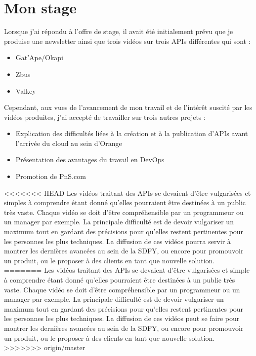 \chapter{Mon stage}
\label{sec:unchapitre}

Lorsque j'ai répondu à l'offre de stage, il avait été initialement prévu que je produise une newsletter ainsi que trois vidéos sur trois APIs différentes qui sont :

\begin{itemize}
    \item Gat'Ape/Okapi
    \item Zbus
    \item Valkey
\end{itemize}

Cependant, aux vues de l'avancement de mon travail et de l'intérêt suscité par les vidéos produites, j'ai accepté de travailler sur trois autres projets :

\begin{itemize}
    \item Explication des difficultés liées à la création et à la publication d'APIs avant l'arrivée du cloud au sein d'Orange
    \item Présentation des avantages du travail en DevOps
    \item Promotion de PnS.com
\end{itemize}



<<<<<<< HEAD
Les vidéos traitant des APIs se devaient d'être vulgarisées et simples à comprendre étant donné qu'elles pourraient être destinées à un public très vaste. Chaque vidéo se doit d'être compréhensible par un programmeur ou un manager par exemple. La principale difficulté est de devoir vulgariser un maximum tout en gardant des précisions pour qu'elles restent pertinentes pour les personnes les plus techniques. La diffusion de ces vidéos pourra servir à montrer les dernières avancées au sein de la SDFY, ou encore pour promouvoir un produit, ou le proposer à des clients en tant que nouvelle solution. \\
=======
Les vidéos traitant des APIs se devaient d'être vulgarisées et simple à comprendre étant donné qu'elles pourraient être destinées à un public très vaste. Chaque vidéo se doit d'être compréhensible par un programmeur ou un manager par exemple. La principale difficulté est de devoir vulgariser un maximum tout en gardant des précisions pour qu'elles restent pertinentes pour les personnes les plus techniques. La diffusion de ces vidéos peut se faire pour montrer les dernières avancées au sein de la SDFY, ou encore pour promouvoir un produit, ou le proposer à des clients en tant que nouvelle solution. \\
>>>>>>> origin/master

